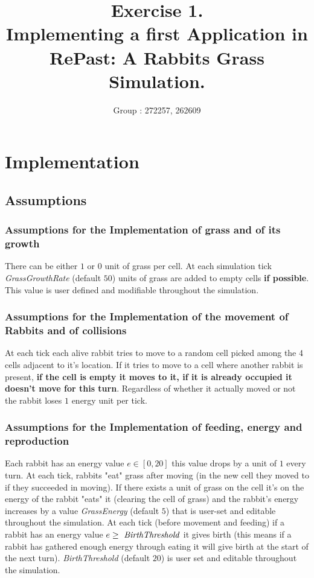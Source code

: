 \documentclass[11pt]{article}
\title{\bf Exercise 1.\\ Implementing a first Application in RePast: A Rabbits Grass Simulation.}
\author{Group \textnumero: 272257, 262609}
\begin{document}
\maketitle

\section{Implementation}


\subsection{Assumptions}

\subsubsection{Assumptions for the Implementation of grass and of its growth}

There can be either $1$ or $0$ unit of grass per cell. At each simulation tick \textit{GrassGrowthRate} (default $50$) units of grass are added to empty cells \textbf{if possible}. This value is user defined and modifiable throughout the simulation.

\subsubsection{Assumptions for the Implementation of the movement of Rabbits and of collisions}

At each tick each alive rabbit tries to move to a random cell picked among the 4 cells adjacent to it's location. If it tries to move to a cell where another rabbit is present, \textbf{if the cell is empty it moves to it, if it is already occupied it doesn't move for this turn}. Regardless of whether it actually moved or not the rabbit loses $1$ energy unit per tick.

\subsubsection{Assumptions for the Implementation of feeding, energy and reproduction}

Each rabbit has an energy value $e \in [0,20]$ this value drops by a unit of $1$ every turn. At each tick, rabbits "eat" grass after moving (in the new cell they moved to if they succeeded in moving). If there exists a unit of grass on the cell it's on the energy of the rabbit "eats" it (clearing the cell of grass) and the rabbit's energy increases by a value \textit{GrassEnergy} (default $5$) that is user-set and editable throughout the simulation. At each tick (before movement and feeding) if a rabbit has an energy value $e \geq \text{ \textit{BirthThreshold}}$ it gives birth (this means if a rabbit has gathered enough energy through eating it will give birth at the start of the next turn). \textit{BirthThreshold} (default $20$) is user set and editable throughout the simulation. 
\end{document}
